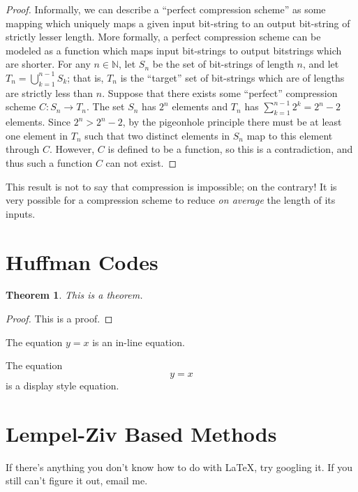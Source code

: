 \documentclass[12pt]{article}
\newtheorem{thm}{Theorem}[section]
\begin{document}
\begin{proof}
  Informally, we can describe a ``perfect compression scheme'' as some
  mapping which uniquely maps a given input bit-string to an output
  bit-string of strictly lesser length. More formally, a perfect
  compression scheme can be modeled as a function which maps input
  bit-strings to output bitstrings which are shorter. For any
  $n \in \mathbb{N}$, let $S_n$ be the set of bit-strings of length
  $n$, and let $T_n = \bigcup_{k = 1}^{n - 1} S_k$; that is, $T_n$ is
  the ``target'' set of bit-strings which are of lengths are strictly
  less than $n$. Suppose that there exists some ``perfect''
  compression scheme $C:S_n \to T_n$. The set $S_n$ has $2^n$ elements
  and $T_n$ has $\sum_{k=1}^{n-1}2^k = 2^n - 2$ elements. Since
  $2^n > 2^n - 2$, by the pigeonhole principle there must be at least
  one element in $T_n$ such that two distinct elements in $S_n$ map to
  this element through $C$. However, $C$ is defined to be a function,
  so this is a contradiction, and thus such a function $C$ can not
  exist.
\end{proof}

This result is not to say that compression is impossible; on the
contrary! It is very possible for a compression scheme to reduce
\emph{on average} the length of its inputs.

\section{Huffman Codes}

\begin{thm}
  This is a theorem.
\end{thm}

\begin{proof}
This is a proof.
\end{proof}

The equation $y=x$ is an in-line equation.

The equation
\[
y=x
\]
is a display style equation.

\section{Lempel-Ziv Based Methods}

If there's anything you don't know how to do with \LaTeX{}, try
googling it. If you still can't figure it out, email me.
\end{document}
